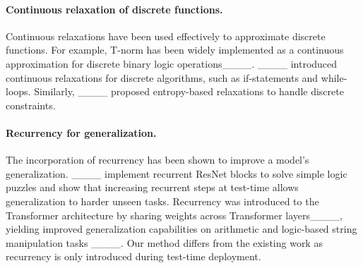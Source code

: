 \paragraph{Continuous relaxation of discrete functions.}
Continuous relaxations have been used effectively to approximate discrete functions. For example, T-norm has been widely implemented as a continuous approximation for discrete binary logic operations____. ____ introduced continuous relaxations for discrete algorithms, such as if-statements and while-loops. Similarly, ____ proposed entropy-based relaxations to handle discrete constraints.


\paragraph{Recurrency for generalization.}
The incorporation of recurrency has been shown to improve a model's generalization. ____ implement recurrent ResNet blocks to solve simple logic puzzles and show that increasing recurrent steps at test-time allows generalization to harder unseen tasks. Recurrency was introduced to the Transformer architecture by sharing weights across Transformer layers____, yielding improved generalization capabilities on arithmetic and logic-based string manipulation tasks ____. Our method differs from the existing work as recurrency is only introduced during test-time deployment.